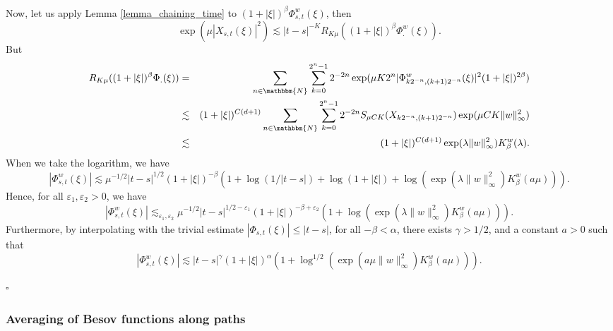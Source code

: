 \documentclass[a4paper,11pt]{article}
\newenvironment{proof}{{\sc Proof.}}{\hfill$\square$}
\begin{document}
\begin{proof}
  
  Now, let us apply Lemma \ref{lemma_chaining_time} to $( 1+ | \xi | )^{\beta}
  \Phi^{w}_{s,t} ( \xi )$, then
  \[ \exp ( \mu | X_{s,t} ( \xi ) |^{2} ) \lesssim | t-s |^{-K} R_{K \mu} ( (
     1+ | \xi | )^{\beta} \Phi^{w}_{.} ( \xi ) ) .\]
  But
  \begin{eqnarray*}
    R_{K \mu} ( ( 1+ | \xi | )^{\beta} \Phi_{.} ( \xi ) ) & = & \sum_{n \in
    \mathbbm{N}} \sum_{k=0}^{2^{n} -1} 2^{-2n} \exp ( \mu K2^{n} |
    \Phi^{w}_{k2^{-n} , ( k+1 ) 2^{-n}} ( \xi ) |^{2} ( 1+ | \xi | )^{2 \beta}
    )\\
    & \lesssim & ( 1+ | \xi | )^{C ( d+1 )} \sum_{n \in \mathbbm{N}}
    \sum_{k=0}^{2^{n} -1} 2^{-2n} S_{\mu C K} ( X_{k2^{-n} , ( k+1 ) 2^{-n}} )
    \exp ( \mu C K \| w \|_{\infty}^{2} )\\
    & \lesssim & ( 1+ | \xi | )^{C ( d+1 )} \exp ( \lambda \| w
    \|_{\infty}^{2} ) K^{w}_{\beta} ( \lambda ) .
  \end{eqnarray*}
  When we take the logarithm, we have
  \[ | \Phi_{s,t}^{w} ( \xi ) | \lesssim \mu^{-1/2} | t-s |^{1/2} ( 1+ | \xi |
     )^{- \beta} ( 1+ \log(1/| t-s |) + \log ( 1+ | \xi | ) + \log ( \exp (
     \lambda \| w \|_{\infty}^{2} ) K^{w}_{\beta} ( a \mu ) ) ) . \]
  Hence, for all $\varepsilon_{1} , \varepsilon_{2} >0$, we have
  \[ | \Phi_{s,t}^{w} ( \xi ) | \lesssim_{\varepsilon_{1} , \varepsilon_{2}}
     \mu^{-1/2} | t-s |^{1/2- \varepsilon_{1}} ( 1+ | \xi | )^{- \beta +
     \varepsilon_{2}} ( 1+ \log ( \exp ( \lambda \| w \|_{\infty}^{2} )
     K^{w}_{\beta} ( a \mu ) ) ) . \]
  Furthermore, by interpolating with the trivial estimate $| \Phi_{s,t} ( \xi
  ) | \leqslant | t-s |$, for all $- \beta < \alpha$, there exists $\gamma
  >1/2$, and a constant $a>0$ such that
  \[ | \Phi_{s,t}^{w} ( \xi ) | \lesssim | t-s |^{\gamma} ( 1+ | \xi |
     )^{\alpha} ( 1+ \log^{1/2} ( \exp ( a \mu \| w \|_{\infty}^{2} )
     K^{w}_{\beta} ( a \mu ) ) ) . \]
  
\end{proof}

\subsubsection{Averaging of Besov functions along paths}
\end{document}
